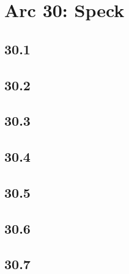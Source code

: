 \part*{Arc 30: Speck}
 \chapter*{30.1}
 \chapter*{30.2}
 \chapter*{30.3}
 \chapter*{30.4}
 \chapter*{30.5}
 \chapter*{30.6}
 \chapter*{30.7}








